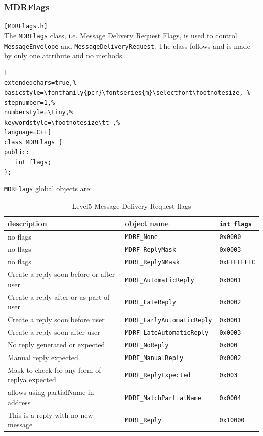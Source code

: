 \subsubsection{MDRFlags}
\texttt{[MDRFlags.h]}\\
The \texttt{MDRFlags} class, i.e. Message Delivery Request Flags, is used to control \texttt{MessageEnvelope} and \texttt{MessageDeliveryRequest}. The class follows and is made by only one attribute and no methods.

\begin{lstlisting}[
extendedchars=true,%
basicstyle=\fontfamily{pcr}\fontseries{m}\selectfont\footnotesize, %
stepnumber=1,%
numberstyle=\tiny,%
keywordstyle=\footnotesize\tt ,%
language=C++]
class MDRFlags {
public:
   int flags;
};
\end{lstlisting}

\texttt{MDRFlags} global objects are:

\begin{table}[!h]
 \begin{center}
  \begin{tabular}{|l|l|l|}
   \hline
description & object name & \texttt{int flags} \\
   \hline
no flags & \texttt{MDRF\_None} & \texttt{0x0000} \\
no flags & \texttt{MDRF\_ReplyMask} & \texttt{0x0003} \\
no flags & \texttt{MDRF\_ReplyNMask} & \texttt{0xFFFFFFFC} \\
Create a reply soon before or after user & \texttt{MDRF\_AutomaticReply} & \texttt{0x0001} \\
Create a reply after or as part of user & \texttt{MDRF\_LateReply} & \texttt{0x0002} \\
Create a reply soon before user & \texttt{MDRF\_EarlyAutomaticReply} & \texttt{0x0001} \\
Create a reply soon after user & \texttt{MDRF\_LateAutomaticReply} & \texttt{0x0003} \\
No reply generated or expected & \texttt{MDRF\_NoReply} & \texttt{0x000} \\
Manual reply expected & \texttt{MDRF\_ManualReply} & \texttt{0x0002} \\
Mask to check for any form of replya expected & \texttt{MDRF\_ReplyExpected} & \texttt{0x003} \\
allows using partialName in address & \texttt{MDRF\_MatchPartialName} & \texttt{0x0004} \\
This is a reply with no new message & \texttt{MDRF\_Reply} & \texttt{0x10000} \\
    \hline
    \end{tabular}
   \end{center}
  \caption{Level5 Message Delivery Request flags}
 \label{t:level5:MDRFlags}
\end{table}



